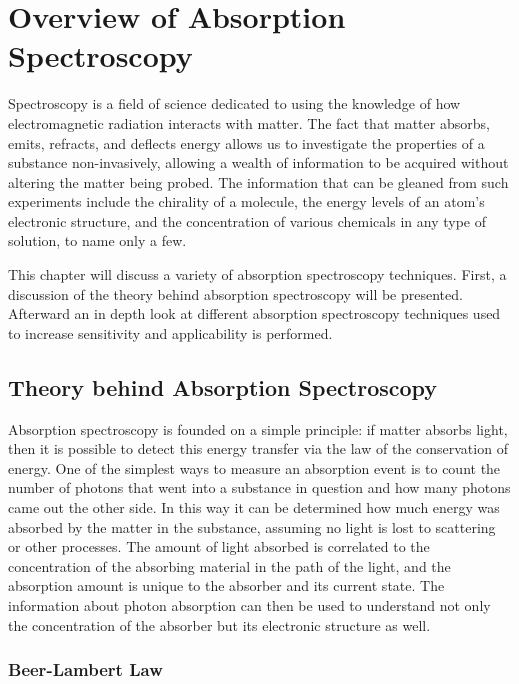 \chapter{Overview of Absorption Spectroscopy}\label{ch:overview}

Spectroscopy is a field of science dedicated to using the knowledge of how
electromagnetic radiation interacts with matter. The fact that matter absorbs,
emits, refracts, and deflects energy allows us to investigate the properties
of a substance non-invasively, allowing a wealth of information to be acquired
without altering the matter being probed. The information that can be gleaned
from such experiments include the chirality of a molecule, the energy levels
of an atom's electronic structure, and the concentration of various chemicals
in any type of solution, to name only a few.

This chapter will discuss a variety of absorption spectroscopy techniques.
First, a discussion of the theory behind absorption spectroscopy will be
presented. Afterward an in depth look at different absorption spectroscopy
techniques used to increase sensitivity and applicability is performed.



\section{Theory behind Absorption Spectroscopy}\label{sec:abs_theory}

Absorption spectroscopy is founded on a simple principle: if matter absorbs
light, then it is possible to detect this energy transfer via the law of the
conservation of energy. One of the simplest ways to measure an absorption
event is to count the number of photons that went into a substance in question
and how many photons came out the other side. In this way it can be determined
how much energy was absorbed by the matter in the substance, assuming no light
is lost to scattering or other processes. The amount of light absorbed is
correlated to the concentration of the absorbing material in the path of the
light, and the absorption amount is unique to the absorber and its current
state. The information about photon absorption can then be used to understand
not only the concentration of the absorber but its electronic structure as
well.



\subsection{Beer-Lambert Law}\label{subsec:beer}


